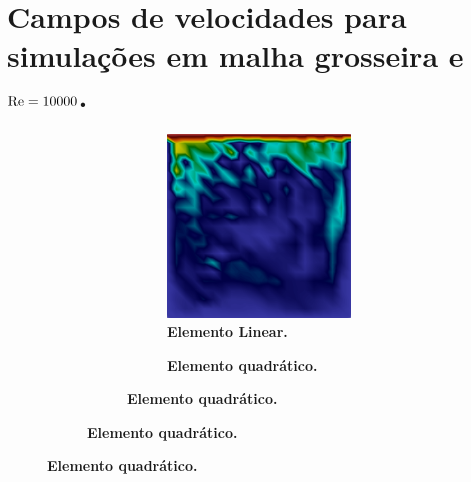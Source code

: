 \chapter*{Campos de velocidades para simulações em malha grosseira e $\mathrm{Re}=10000$.}

\begin{figure}[h!]
    \centering
    \caption{Campos de velocidades no instante $t=100$.}
    \begin{subfigure}{\textwidth}\centering
        \begin{subfigure}{\textwidth}\centering
            \begin{subfigure}{.32\textwidth}
                \caption*{\textbf{Elemento Linear.}}
                \includegraphics[width=\linewidth]{Figuras/cavity-poor/None-Lin.png}
            \end{subfigure}
            \begin{subfigure}{.32\textwidth}
                \caption*{\textbf{Elemento quadrático.}}

\end{subfigure}
\end{subfigure}
\end{subfigure}
\end{figure}
